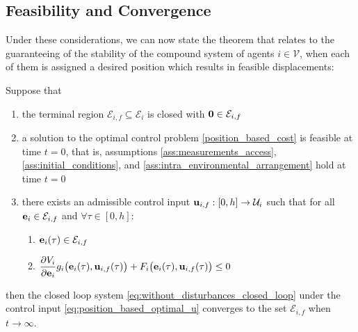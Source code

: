 \subsection{Feasibility and Convergence}

Under these considerations, we can now state the theorem that relates to
the guaranteeing of the stability of the compound system of agents
$i \in \mathcal{V}$, when each of them is assigned a desired
position which results in feasible displacements:\\

\begin{bw_box}
\begin{theorem}

  Suppose that

  \begin{enumerate}
    \item the terminal region $\mathcal{E}_{i,f} \subseteq \mathcal{E}_i$ is
      closed with $\bm{\mathbf{0}} \in \mathcal{E}_{i,f}$
    \item a solution to the optimal control problem \eqref{position_based_cost}
      is feasible at time $t=0$, that is, assumptions
      \eqref{ass:measurements_access}, \eqref{ass:initial_conditions}, and
      \eqref{ass:intra_environmental_arrangement} hold at time $t=0$
    \item there exists an admissible control input
      $\bm{\mathbf{u}}_{i,f} : [0, h] \to \mathcal{U}_i$ such that for all
      $\bm{\mathbf{e}}_i \in \mathcal{E}_{i,f}$ and $\forall \tau \in [0,h]$:

      \begin{enumerate}
        \item $\bm{\mathbf{e}}_i(\tau) \in \mathcal{E}_{i,f}$
        \item $\dfrac{\partial V_i}{\partial \bm{\mathbf{e}}_i} g_i\big(\bm{\mathbf{e}}_i(\tau), \bm{\mathbf{u}}_{i,f}(\tau)\big)
          + F_i\big(\bm{\mathbf{e}}_i(\tau), \bm{\mathbf{u}}_{i,f}(\tau)\big) \leq 0$
      \end{enumerate}

  \end{enumerate}

  then the closed loop system \eqref{eq:without_disturbances_closed_loop} under
  the control input \eqref{eq:position_based_optimal_u} converges to the set
  $\mathcal{E}_{i,f}$ when $t \to \infty$.

\end{theorem}
\end{bw_box}


